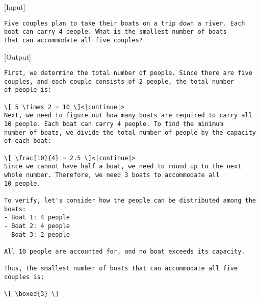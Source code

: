 \begin{tcolorbox}[gray_box, title = {{Synthetic Data Example Type I: No reflection}}]\tiny
[Input]
\begin{verbatim}
Five couples plan to take their boats on a trip down a river. Each boat can carry 4 people. What is the smallest number of boats
that can accommodate all five couples?
\end{verbatim}

\hdashrule[0.5ex]{\linewidth}{0.1mm}{0.1mm} %

[Output]
\begin{verbatim}
First, we determine the total number of people. Since there are five couples, and each couple consists of 2 people, the total number
of people is:

\[ 5 \times 2 = 10 \]<|continue|>
Next, we need to figure out how many boats are required to carry all 10 people. Each boat can carry 4 people. To find the minimum
number of boats, we divide the total number of people by the capacity of each boat:

\[ \frac{10}{4} = 2.5 \]<|continue|>
Since we cannot have half a boat, we need to round up to the next whole number. Therefore, we need 3 boats to accommodate all 
10 people.

To verify, let's consider how the people can be distributed among the boats:
- Boat 1: 4 people
- Boat 2: 4 people
- Boat 3: 2 people

All 10 people are accounted for, and no boat exceeds its capacity.

Thus, the smallest number of boats that can accommodate all five couples is:

\[ \boxed{3} \]
\end{verbatim}
\end{tcolorbox}